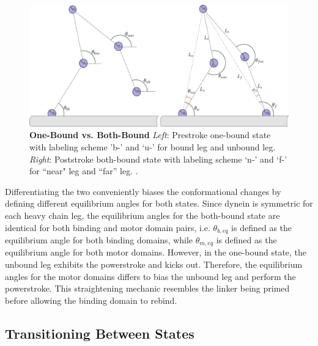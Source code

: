 \begin{figure}[H]
	\centering
	\includegraphics[width=0.9\columnwidth]{Figures/OB_vs_BB.PNG}
	\caption[One-Bound vs. Both-Bound]{\textbf{One-Bound vs. Both-Bound} \textit{Left}: Prestroke one-bound state with labeling scheme 'b-’ and ‘u-’ for bound leg and unbound leg. \textit{Right}: Poststroke both-bound state with labeling scheme ‘n-’ and ‘f-’ for ``near" leg and ``far'' leg. \cite{Capek2017}.}
	\label{fig:OBvsBB}
\end{figure}

Differentiating the two conveniently biases the conformational changes by defining different equilibrium angles for both states. Since dynein is symmetric for each heavy chain leg, the equilibrium angles for the both-bound state are identical for both binding and motor domain pairs, i.e. $\theta_{b,eq}$ is defined as the equilibrium angle for both binding domains, while $\theta_{m,eq}$ is defined as the equilibrium angle for both motor domains. However, in the one-bound state, the unbound leg exhibits the powerstroke and kicks out. Therefore, the equilibrium angles for the motor domains differs to bias the unbound leg and perform the powerstroke. This straightening mechanic resembles the linker being primed before allowing the binding domain to rebind.


\subsection{Transitioning Between States}

